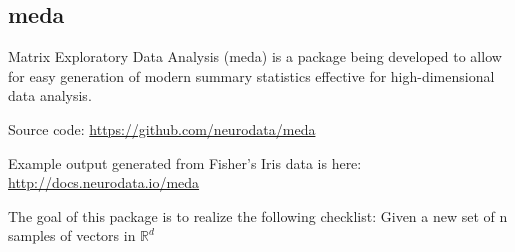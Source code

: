

\subsection{meda}

Matrix Exploratory Data Analysis (meda) is a package being developed to
allow for easy generation of modern summary statistics effective for
high-dimensional data analysis. 

\begin{compactitem}
  \item Source code: \href{https://github.com/neurodata/meda}{https://github.com/neurodata/meda}
  \item Example output generated from Fisher's Iris data is here:
    \href{http://docs.neurodata.io/meda}{http://docs.neurodata.io/meda}
\end{compactitem}

The goal of this package is to realize the following checklist: Given a new set of n samples of vectors in $\mathbb{R}^d$

